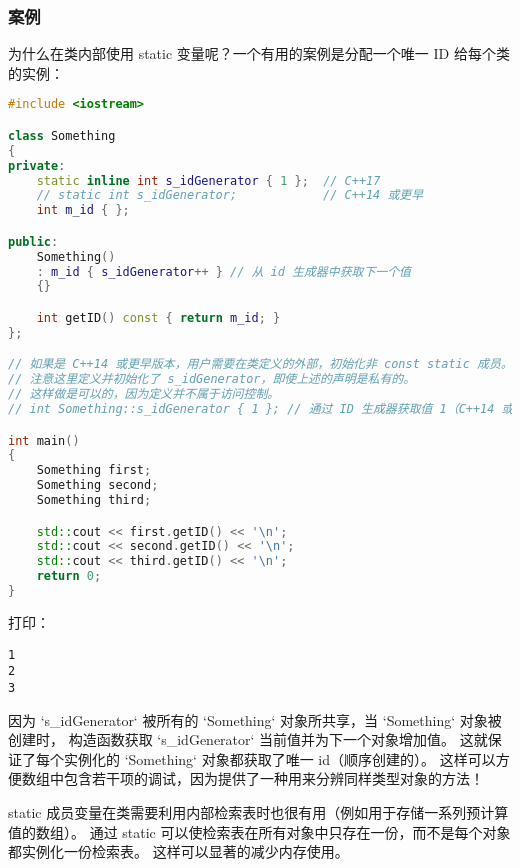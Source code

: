 \documentclass[../../LearnCpp.tex]{subfiles}
\begin{document}
\subsubsection*{案例}

为什么在类内部使用 static 变量呢？一个有用的案例是分配一个唯一 ID 给每个类的实例：

\begin{lstlisting}[language=C++]
#include <iostream>

class Something
{
private:
    static inline int s_idGenerator { 1 };  // C++17
    // static int s_idGenerator;            // C++14 或更早
    int m_id { };

public:
    Something()
    : m_id { s_idGenerator++ } // 从 id 生成器中获取下一个值
    {}

    int getID() const { return m_id; }
};

// 如果是 C++14 或更早版本，用户需要在类定义的外部，初始化非 const static 成员。
// 注意这里定义并初始化了 s_idGenerator，即使上述的声明是私有的。
// 这样做是可以的，因为定义并不属于访问控制。
// int Something::s_idGenerator { 1 }; // 通过 ID 生成器获取值 1（C++14 或更早版本）

int main()
{
    Something first;
    Something second;
    Something third;

    std::cout << first.getID() << '\n';
    std::cout << second.getID() << '\n';
    std::cout << third.getID() << '\n';
    return 0;
}
\end{lstlisting}

打印：

\begin{lstlisting}
1
2
3
\end{lstlisting}

因为 `s\_idGenerator` 被所有的 `Something` 对象所共享，当 `Something` 对象被创建时，
构造函数获取 `s\_idGenerator` 当前值并为下一个对象增加值。
这就保证了每个实例化的 `Something` 对象都获取了唯一 id（顺序创建的）。
这样可以方便数组中包含若干项的调试，因为提供了一种用来分辨同样类型对象的方法！

static 成员变量在类需要利用内部检索表时也很有用（例如用于存储一系列预计算值的数组）。
通过 static 可以使检索表在所有对象中只存在一份，而不是每个对象都实例化一份检索表。
这样可以显著的减少内存使用。
\end{document}
